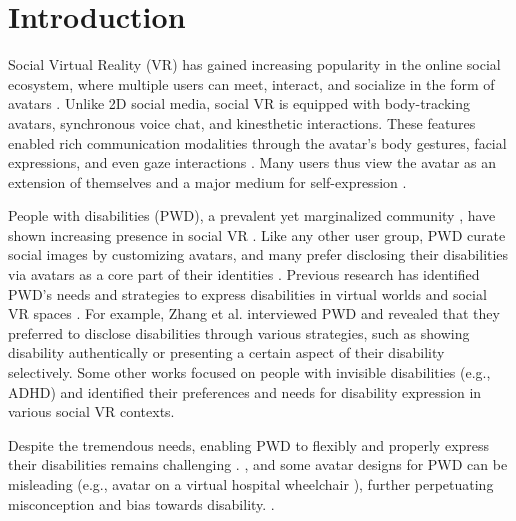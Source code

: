 \section{Introduction}

Social Virtual Reality (VR) has gained increasing popularity in the online social ecosystem, where multiple users can meet, interact, and socialize in the form of avatars \cite{Freeman2020}. Unlike 2D social media, social VR is equipped with body-tracking avatars, synchronous voice chat, and kinesthetic interactions. These features enabled rich communication modalities through the avatar's body gestures, facial expressions, and even gaze interactions \cite{maloney_nonverbal}. Many users thus view the avatar as an extension of themselves and a major medium for self-expression \cite{Manninen2007, Freeman2021}.

People with disabilities (PWD), a prevalent yet marginalized community \cite{WHO2023}, have shown increasing presence in social VR \cite{zhang2022, meta_horizon_accessibility}. 
Like any other user group, PWD curate social images by customizing avatars, and many prefer disclosing their disabilities via avatars as a core part of their identities \cite{zhang2022, kelly2023}. Previous research has identified PWD's needs and strategies to express disabilities in virtual worlds and social VR spaces \cite{zhang2022, kelly2023, Gualano_2023, zhang2023}. For example, Zhang et al. \cite{zhang2022} interviewed PWD and revealed that they preferred to disclose disabilities through various strategies, such as showing disability authentically or presenting a certain aspect of their disability selectively. Some other works \cite{kelly2023, Gualano_2023} focused on people with invisible disabilities (e.g., ADHD) and identified their preferences and needs for disability expression in various social VR contexts. 

Despite the tremendous needs, enabling PWD to flexibly and properly express their disabilities remains challenging . , and some avatar designs for PWD can be misleading (e.g., avatar on a virtual hospital wheelchair \cite{kelly_AI24, zhang2023}), further perpetuating misconception and bias towards disability. .  


